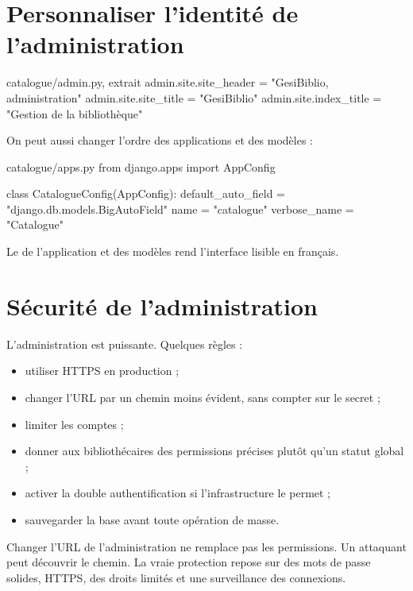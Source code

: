 \section{Personnaliser l'identité de l'administration}

\begin{codebox}[python]{catalogue/admin.py, extrait}
admin.site.site_header = "GesiBiblio, administration"
admin.site.site_title = "GesiBiblio"
admin.site.index_title = "Gestion de la bibliothèque"
\end{codebox}

On peut aussi changer l'ordre des applications et des modèles :

\begin{codebox}[python]{catalogue/apps.py}
from django.apps import AppConfig


class CatalogueConfig(AppConfig):
    default_auto_field = "django.db.models.BigAutoField"
    name = "catalogue"
    verbose_name = "Catalogue"
\end{codebox}

Le  de l'application et des modèles rend l'interface lisible en
français.

\section{Sécurité de l'administration}

L'administration est puissante. Quelques règles :

\begin{bonne}
\begin{itemize}
  \item utiliser HTTPS en production ;
  \item changer l'URL  par un chemin moins évident, sans compter
        sur le secret ;
  \item limiter les comptes  ;
  \item donner aux bibliothécaires des permissions précises plutôt qu'un statut
        global ;
  \item activer la double authentification si l'infrastructure le permet ;
  \item sauvegarder la base avant toute opération de masse.
\end{itemize}
\end{bonne}

\begin{attention}
Changer l'URL de l'administration ne remplace pas les permissions. Un attaquant
peut découvrir le chemin. La vraie protection repose sur des mots de passe solides,
HTTPS, des droits limités et une surveillance des connexions.
\end{attention}

